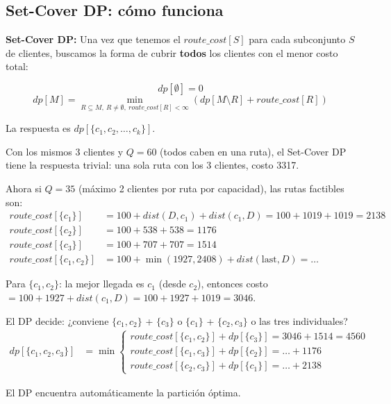 \documentclass[12pt,a4paper]{article}
\begin{document}
\subsection{Set-Cover DP: cómo funciona}

\begin{definicion}
\textbf{Set-Cover DP:} Una vez que tenemos el $route\_cost[S]$ para cada subconjunto $S$ de clientes, buscamos la forma de cubrir \textbf{todos} los clientes con el menor costo total:

$$dp[\emptyset] = 0$$
$$dp[M] = \min_{R \subseteq M,\ R \neq \emptyset,\ route\_cost[R] < \infty} \left( dp[M \setminus R] + route\_cost[R] \right)$$

La respuesta es $dp[\{c_1, c_2, \ldots, c_k\}]$.
\end{definicion}

\begin{ejemplo}
Con los mismos 3 clientes y $Q=60$ (todos caben en una ruta), el Set-Cover DP tiene la respuesta trivial: una sola ruta con los 3 clientes, costo 3317.

Ahora si $Q=35$ (máximo 2 clientes por ruta por capacidad), las rutas factibles son:
\begin{align*}
route\_cost[\{c_1\}] &= 100 + dist(D,c_1) + dist(c_1,D) = 100+1019+1019 = 2138 \\
route\_cost[\{c_2\}] &= 100 + 538 + 538 = 1176 \\
route\_cost[\{c_3\}] &= 100 + 707 + 707 = 1514 \\
route\_cost[\{c_1,c_2\}] &= 100 + \min(1927,2408) + dist(\text{last}, D) = \ldots
\end{align*}

Para $\{c_1,c_2\}$: la mejor llegada es $c_1$ (desde $c_2$), entonces costo $= 100+1927+dist(c_1,D)=100+1927+1019=3046$.

El DP decide: ¿conviene $\{c_1,c_2\}$ + $\{c_3\}$ o $\{c_1\}$ + $\{c_2,c_3\}$ o las tres individuales?
\begin{align*}
dp[\{c_1,c_2,c_3\}] &= \min\begin{cases}
route\_cost[\{c_1,c_2\}] + dp[\{c_3\}] = 3046 + 1514 = 4560 \\
route\_cost[\{c_1,c_3\}] + dp[\{c_2\}] = \ldots + 1176 \\
route\_cost[\{c_2,c_3\}] + dp[\{c_1\}] = \ldots + 2138
\end{cases}
\end{align*}

El DP encuentra automáticamente la partición óptima.
\end{ejemplo}
\end{document}
